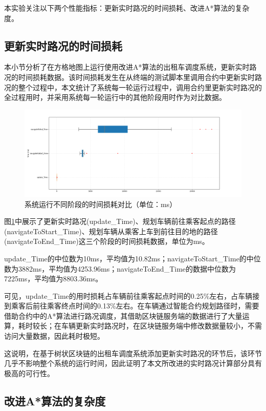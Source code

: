 本实验关注以下两个性能指标：更新实时路况的时间损耗、改进A*算法的复杂度。

\subsection{更新实时路况的时间损耗}

本小节分析了在方格地图上运行使用改进A*算法的出租车调度系统，更新实时路况的时间损耗数据。该时间损耗发生在从终端的测试脚本里调用合约中更新实时路况的整个过程中，本文统计了系统每一轮运行过程中，调用合约里更新实时路况的全过程用时，并采用系统每一轮运行中的其他阶段用时作为对比数据。

\begin{figure}[ht]
  \centering
  \includegraphics[width=1\textwidth]{undergraduate-thesis/images/2023-05-22 (2).png}
  \caption{系统运行不同阶段的时间损耗对比（单位：ms）}
  \label{nine-new-Taxi-time} %
\end{figure}

图\ref{nine-new-Taxi-time}中展示了更新实时路况(update\_Time)、规划车辆前往乘客起点的路径(navigateToStart\_Time)、规划车辆从乘客上车到前往目的地的路径(navigateToEnd\_Time)这三个阶段的时间损耗数据，单位为ms。

update\_Time的中位数为10ms，平均值为10.82ms；navigateToStart\_Time的中位数为3882ms，平均值为4253.96ms；navigateToEnd\_Time的数据中位数为7225ms，平均值为8803.36ms。

可见，update\_Time的用时损耗占车辆前往乘客起点时间的0.25\%左右，占车辆接到乘客后前往乘客终点时间的0.13\%左右。在车辆通过智能合约规划路径时，需要借助合约中的A*算法进行路况调度，其借助区块链服务端的数据进行了大量运算，耗时较长；在车辆更新实时路况时，在区块链服务端中修改数据量较小，不需访问大量数据，因此耗时极短。

这说明，在基于树状区块链的出租车调度系统添加更新实时路况的环节后，该环节几乎不影响整个系统的运行时间，因此证明了本文所改进的实时路况计算部分具有极高的可行性。

\subsection{改进A*算法的复杂度}

